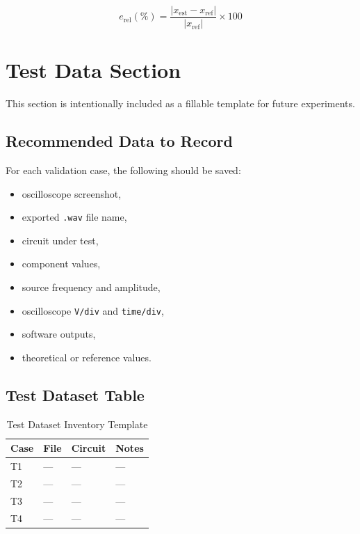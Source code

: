 \documentclass[conference]{IEEEtran}
\begin{document}
\begin{equation}
e_{\mathrm{rel}}(\%) = \frac{|x_{\mathrm{est}} - x_{\mathrm{ref}}|}{|x_{\mathrm{ref}}|}\times 100
\end{equation}

\section{Test Data Section}
This section is intentionally included as a fillable template for future experiments.

\subsection{Recommended Data to Record}
For each validation case, the following should be saved:

\begin{itemize}
    \item oscilloscope screenshot,
    \item exported \texttt{.wav} file name,
    \item circuit under test,
    \item component values,
    \item source frequency and amplitude,
    \item oscilloscope \texttt{V/div} and \texttt{time/div},
    \item software outputs,
    \item theoretical or reference values.
\end{itemize}

\subsection{Test Dataset Table}
\begin{table}[ht]
\caption{Test Dataset Inventory Template}
\label{tab:test-dataset}
\centering
\begin{tabularx}{\columnwidth}{>{\raggedright\arraybackslash}p{} >{\raggedright\arraybackslash}p{} >{\raggedright\arraybackslash}p{} X}
\toprule
\textbf{Case} & \textbf{File} & \textbf{Circuit} & \textbf{Notes} \\
\midrule
T1 & --- & --- & --- \\
T2 & --- & --- & --- \\
T3 & --- & --- & --- \\
T4 & --- & --- & --- \\
\bottomrule
\end{tabularx}
\end{table}
\end{document}
